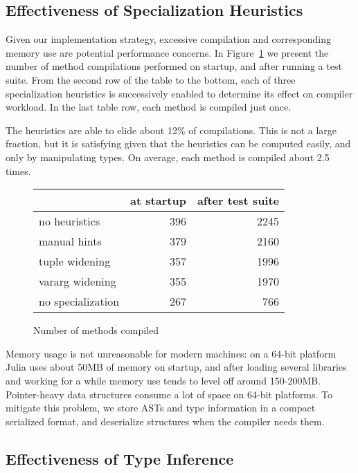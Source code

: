 \documentclass[9pt]{sigplanconf}
\begin{document}
\subsection{Effectiveness of Specialization Heuristics}

Given our implementation strategy, excessive compilation and corresponding
memory use are potential performance concerns. In Figure~\ref{ncomp}
we present the number of method compilations performed on startup, and
after running a test suite. From the second row of the table to the bottom,
each of three specialization heuristics is successively enabled to
determine its effect on compiler workload. In the last table row, each
method is compiled just once.

The heuristics are able to elide about 12\% of compilations. This is
not a large fraction, but it is satisfying given that the heuristics can
be computed easily, and only by manipulating types. On average, each
method is compiled about 2.5 times.

\begin{figure}
\caption{Number of methods compiled}
\label{ncomp}
\begin{center}
\begin{tabular}{|l|r|r|}\hline
    & at startup & after test suite \\
\hline \hline
no heuristics & 396 & 2245 \\
\hline
manual hints & 379 & 2160 \\
\hline
tuple widening & 357 & 1996 \\
\hline
vararg widening & 355 & 1970 \\
\hline
no specialization & 267 & 766 \\
\hline
\end{tabular}
\end{center}
\end{figure}

Memory usage is not unreasonable for modern machines: on a 64-bit platform
Julia uses about 50MB of memory on startup, and after loading several
libraries and working for a while memory use tends to level off around
150-200MB. Pointer-heavy data structures consume a lot of space on
64-bit platforms. To mitigate this problem, we store ASTs and type
information in a compact serialized format, and deserialize structures
when the compiler needs them.


\subsection{Effectiveness of Type Inference}
\end{document}
